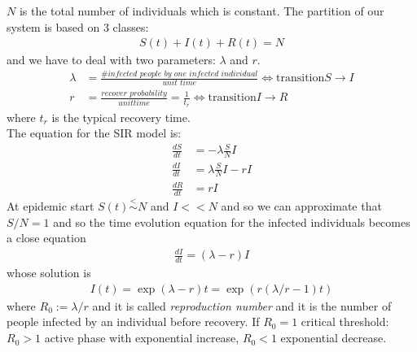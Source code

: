 \documentclass[\main/main.tex]{subfiles}
\begin{document}
$N$ is the total number of individuals which is constant.
The partition of our system is based on 3 classes:
\begin{align}
    S(t)+I(t)+R(t)=N
\end{align}
and we have to deal with two parameters: $\lambda$ and $r$.
\begin{align}
    \lambda&=\frac{\textit{\#infected people by one infected individual}}{\textit{unit time}} \Longleftrightarrow \text{transition} S\to I \\
    r&=\frac{\textit{recover probability}}{unit time}=\frac{1}{t_r} \Longleftrightarrow \text{transition} I\to R 
\end{align}
where $t_r$ is the typical recovery time. \\
The equation for the SIR model is:
\begin{align}
    \frac{dS}{dt} &=-\lambda\frac{S}{N}I \\
    \frac{dI}{dt} &=\lambda\frac{S}{N}I-r I \\
    \frac{dR}{dt}&=rI
\end{align}
At epidemic start $S(t)\overset{<}{\sim}N$ and $I<<N$ and so we can approximate that $S/N=1$ and so the time evolution equation for the infected individuals becomes a close equation
\begin{align}
    \frac{dI}{dt}=(\lambda-r)I
\end{align}
whose solution is
\begin{align}
    I(t)=\exp{(\lambda-r)t}=\exp(r(\lambda/r-1)t)
\end{align}
where $R_0:=\lambda/r$ and it is called \textit{reproduction number} and it is the number of people infected by an individual before recovery. If $R_0=1$ critical threshold: $R_0>1$ active phase with exponential increase, $R_0<1$ exponential decrease.
\end{document}
